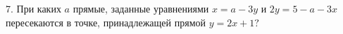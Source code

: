 7. При каких $a$ прямые, заданные уравнениями $x=a-3y$ и $2y=5-a-3x$ пересекаются в точке, принадлежащей прямой $y=2x+1?$\\
